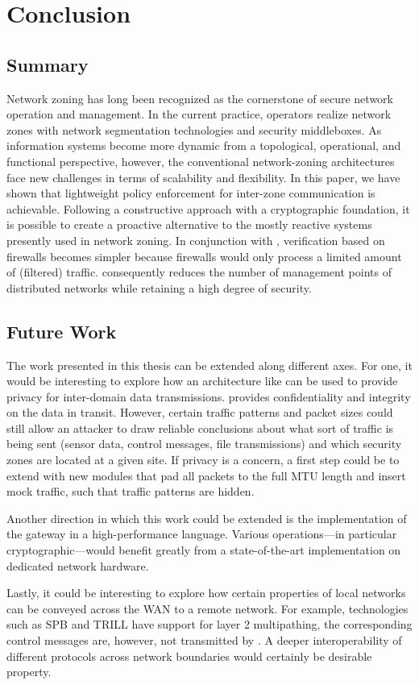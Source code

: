 \chapter{Conclusion}
\label{concl}

\section{Summary}
\label{ssummary}

Network zoning has long been recognized as the cornerstone of secure network operation and management.
In the current practice, operators realize network zones with network segmentation technologies and security middleboxes.
As information systems become more dynamic from a topological, operational, and functional perspective, however, the conventional network-zoning architectures face new challenges in terms of scalability and flexibility.
In this paper, we have shown that lightweight policy enforcement for inter-zone communication
is achievable.
Following a constructive approach with a cryptographic foundation, it is possible to create a proactive alternative to the mostly reactive systems presently used in network zoning.
In conjunction with \name, verification based on firewalls becomes simpler because firewalls would only process a limited amount of (filtered) traffic.
\name consequently reduces the number of management points of distributed networks while retaining a high degree of security.

\section{Future Work}
\label{sfuture}

The work presented in this thesis can be extended along different axes. For
one, it would be interesting to explore how an architecture like \name can be
used to provide privacy for inter-domain data transmissions. \name provides
confidentiality and integrity on the data in transit. However, certain traffic
patterns and packet sizes could still allow an attacker to draw reliable conclusions about
what sort of traffic is being sent (\eg sensor data, control messages, file
transmissions) and which security zones are located
at a given site. If privacy is a concern, a first step could be to extend \tps
with new modules that pad all packets to the full MTU length and insert mock
traffic, such that traffic patterns are hidden.

Another direction in which this work could be extended is the implementation
of the \tp gateway in a high-performance language. Various operations---in
particular cryptographic---would benefit greatly from a state-of-the-art
implementation on dedicated network hardware.

Lastly, it could be interesting to explore how certain properties of local
networks can be conveyed across the WAN to a remote network. For example, technologies such as
SPB and TRILL have support for layer 2 multipathing, the corresponding control
messages are, however, not transmitted by \name. A deeper interoperability of
different protocols across network boundaries would certainly be desirable property.
